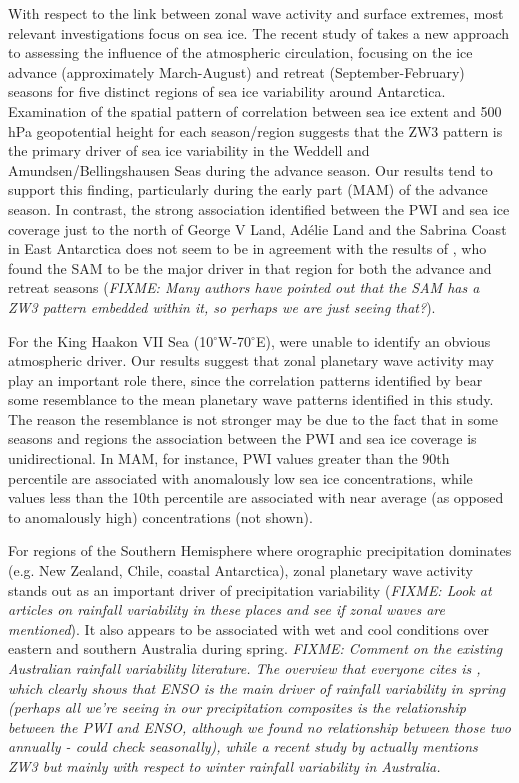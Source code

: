 With respect to the link between zonal wave activity and surface extremes, most relevant investigations focus on sea ice. The recent study of \citet{Raphael2014} takes a new approach to assessing the influence of the atmospheric circulation, focusing on the ice advance (approximately March-August) and retreat (September-February) seasons for five distinct regions of sea ice variability around Antarctica. Examination of the spatial pattern of correlation between sea ice extent and 500 hPa geopotential height for each season/region suggests that the ZW3 pattern is the primary driver of sea ice variability in the Weddell and Amundsen/Bellingshausen Seas during the advance season. Our results tend to support this finding, particularly during the early part (MAM) of the advance season. In contrast, the strong association identified between the PWI and sea ice coverage just to the north of George V Land, Ad{\'e}lie Land and the Sabrina Coast in East Antarctica does not seem to be in agreement with the results of \citet{Raphael2014}, who found the SAM to be the major driver in that region for both the advance and retreat seasons (\textit{FIXME: Many authors have pointed out that the SAM has a ZW3 pattern embedded within it, so perhaps we are just seeing that?}). 

For the King Haakon VII Sea (10$^{\circ}$W-70$^{\circ}$E), \citet{Raphael2014} were unable to identify an obvious atmospheric driver. Our results suggest that zonal planetary wave activity may play an important role there, since the correlation patterns identified by \citet{Raphael2014} bear some resemblance to the mean planetary wave patterns identified in this study. The reason the resemblance is not stronger may be due to the fact that in some seasons and regions the association between the PWI and sea ice coverage is unidirectional. In MAM, for instance, PWI values greater than the 90th percentile are associated with anomalously low sea ice concentrations, while values less than the 10th percentile are associated with near average (as opposed to anomalously high) concentrations (not shown).

For regions of the Southern Hemisphere where orographic precipitation dominates (e.g. New Zealand, Chile, coastal Antarctica), zonal planetary wave activity stands out as an important driver of precipitation variability (\textit{FIXME: Look at articles on rainfall variability in these places and see if zonal waves are mentioned}). It also appears to be associated with wet and cool conditions over eastern and southern Australia during spring. \textit{FIXME: Comment on the existing Australian rainfall variability literature. The overview that everyone cites is \citet{Risbey2009}, which clearly shows that ENSO is the main driver of rainfall variability in spring (perhaps all we're seeing in our precipitation composites is the relationship between the PWI and ENSO, although we found no relationship between those two annually - could check seasonally), while a recent study by \citet{Frederiksen2014} actually mentions ZW3 but mainly with respect to winter rainfall variability in Australia.}

